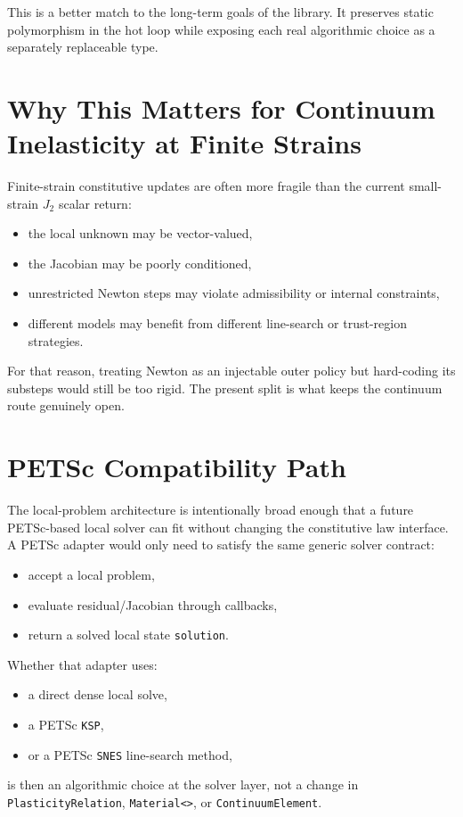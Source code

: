 This is a better match to the long-term goals of the library.  It preserves
static polymorphism in the hot loop while exposing each real algorithmic choice
as a separately replaceable type.

\section{Why This Matters for Continuum Inelasticity at Finite Strains}

Finite-strain constitutive updates are often more fragile than the current
small-strain $J_2$ scalar return:
\begin{itemize}
  \item the local unknown may be vector-valued,
  \item the Jacobian may be poorly conditioned,
  \item unrestricted Newton steps may violate admissibility or internal
        constraints,
  \item different models may benefit from different line-search or trust-region
        strategies.
\end{itemize}

For that reason, treating Newton as an injectable outer policy but hard-coding
its substeps would still be too rigid.  The present split is what keeps the
continuum route genuinely open.

\section{PETSc Compatibility Path}

The local-problem architecture is intentionally broad enough that a future
PETSc-based local solver can fit without changing the constitutive law
interface.  A PETSc adapter would only need to satisfy the same generic solver
contract:
\begin{itemize}
  \item accept a local problem,
  \item evaluate residual/Jacobian through callbacks,
  \item return a solved local state \texttt{solution}.
\end{itemize}

Whether that adapter uses:
\begin{itemize}
  \item a direct dense local solve,
  \item a PETSc \texttt{KSP},
  \item or a PETSc \texttt{SNES} line-search method,
\end{itemize}
is then an algorithmic choice at the solver layer, not a change in
\texttt{PlasticityRelation}, \texttt{Material<>}, or \texttt{ContinuumElement}.

